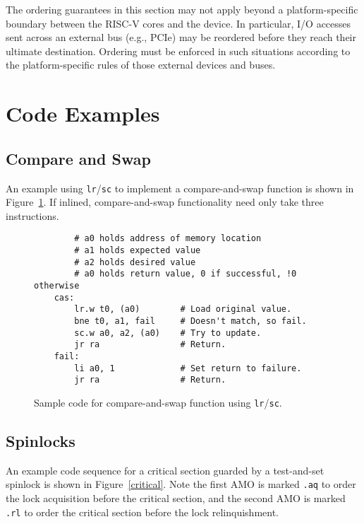 The ordering guarantees in this section may not apply beyond a platform-specific boundary between the RISC-V cores and the device.  In particular, I/O accesses sent across an external bus (e.g., PCIe) may be reordered before they reach their ultimate destination.  Ordering must be enforced in such situations according to the platform-specific rules of those external devices and buses.

\section{Code Examples}
\label{sec:mmcode}

\subsection{Compare and Swap}
An example
using {\tt lr}/{\tt sc} to implement a compare-and-swap function is shown in
Figure~\ref{cas}.  If inlined, compare-and-swap functionality need
only take three instructions.

\begin{figure}[h!]
\begin{center}
\begin{verbatim}
        # a0 holds address of memory location 
        # a1 holds expected value
        # a2 holds desired value
        # a0 holds return value, 0 if successful, !0 otherwise
    cas:
        lr.w t0, (a0)        # Load original value.
        bne t0, a1, fail     # Doesn't match, so fail.
        sc.w a0, a2, (a0)    # Try to update.
        jr ra                # Return.
    fail:
        li a0, 1             # Set return to failure.
        jr ra                # Return.
\end{verbatim}
\end{center}
  \caption{Sample code for compare-and-swap function using {\tt lr}/{\tt sc}.}
\label{cas}
\end{figure}

\subsection{Spinlocks}
\label{sec:spinlock}

An example code sequence for a critical section guarded by a
test-and-set spinlock is shown in Figure~\ref{critical}.  Note the
first AMO is marked {\tt .aq} to order the lock acquisition before the
critical section, and the second AMO is marked {\tt .rl} to order
the critical section before the lock relinquishment.

